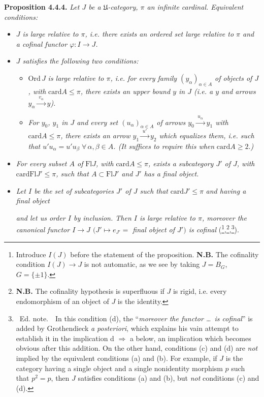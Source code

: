 \documentclass[11pt]{article}
\newcommand{\msp}[1]{\marginpar{\footnotesize [#1]}}
\newcommand{\card}{\mathrm{card}}
\newcommand{\Fl}{\mathrm{Fl}}
\begin{document}
\textbf{Proposition 4.4.4.} \textit{Let $J$ be a $\mathfrak{U}$-category, $\pi$ an infinite cardinal. Equivalent conditions:}
\begin{itemize}[leftmargin=4em]
\item[\textit{a)}] \textit{$J$ is large relative to $\pi$, i.e. there exists an ordered set large relative to $\pi$ and a cofinal functor $\varphi : I \longrightarrow J$.}
\item[\textit{b)}] \textit{$J$ satisfies the following two conditions:}
\begin{itemize}[leftmargin=4em]
\item[$\mathrm{PF}_{\pi}\,1$] $\mathrm{Ord}\,J$ \textit{is large relative to $\pi$, i.e. for every family $(y_\alpha)_{\alpha\in A}$ of objects of $J$, with} $\card A \leqslant \pi$\textit{, there exists an upper bound $y$ in $J$ (i.e. a $y$ and arrows $y_\alpha \xrightarrow{\;v_\alpha\;} y$).}
\item[$\mathrm{PF}_{\pi}\,2$] \textit{For $y_0$, $y_1$ in $J$ and every set $(u_\alpha)_{\alpha\in A}$ of arrows $y_0 \xrightarrow{\;u_\alpha\;} y_1$ with} $\card A \leqslant \pi$\textit{, there exists an arrow $y_1 \xrightarrow{\;u'\;} y_2$ which equalizes them, i.e. such that $u'u_\alpha = u'u_\beta \;\forall\, \alpha,\beta \in A$. (It suffices to require this when} $\card A \geqslant 2$.\textit{)}
\end{itemize}
\item[\textit{c)}] \textit{For every subset $A$ of} $\Fl J$\textit{, with} $\card A \leqslant \pi$\textit{, exists a subcategory $J'$ of $J$, with} $\card\Fl J' \leqslant \pi$\textit{, such that $A \subset \Fl J'$ and $J'$ has a final object.}
\item[\textit{d)}] \textit{Let $I$ be the set of subcategories $J'$ of $J$ such that} $\card J' \leqslant \pi$ \textit{and having a final object}

\msp{page 82}
\textit{and let us order $I$ by inclusion. Then $I$ is large relative to $\pi$, moreover the canonical functor $I \longrightarrow J$ $(J' \longmapsto e_{J'} =$ final object of $J')$ is cofinal} (\footnote{Introduce $I(J)$ before the statement of the proposition. \textbf{N.B.} The cofinality condition $I(J) \longrightarrow J$ is not automatic, as we see by taking $J = B_G$, $G = \{\pm 1\}$.},\footnote{\textbf{N.B.} The cofinality hypothesis is superfluous if $J$ is rigid, i.e. every endomorphism of an object of $J$ is the identity.},\footnote{\ Ed. note.\ \ In this condition (d), the ``\textit{moreover the functor \dots\ is cofinal}'' is added by Grothendieck \textit{a posteriori}, which explains his vain attempt to establish it in the implication d $\Longrightarrow$ a below, an implication which becomes obvious after this addition. On the other hand, conditions (c) and (d) are \textit{not} implied by the equivalent conditions (a) and (b). For example, if $J$ is the category having a single object and a single nonidentity morphism $p$ such that $p^2 = p$, then $J$ satisfies conditions (a) and (b), but \textit{not} conditions (c) and (d).}).
\end{itemize}
\end{document}
